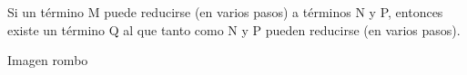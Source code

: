 \begin{theorem}
Si un término M puede reducirse (en varios pasos) a términos N y P, entonces existe un término Q al que tanto como N y P pueden reducirse (en varios pasos).
\end{theorem}

Imagen rombo













